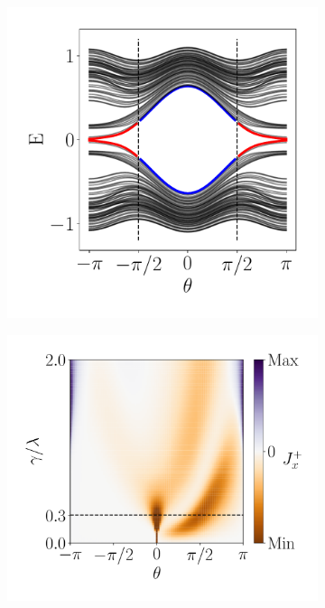 \begin{figure}[h!]
     \centering
    \captionsetup[sub]{font=small}
     \begin{minipage}[h!]{1\textwidth}
         \begin{subfigure}[b!]{0.3 \textwidth}
             \caption{}
             \includegraphics[width=\textwidth]{Imagenes/Resultados_pump_Fractal/xy/param_pump_A=0.5.pdf}
         \end{subfigure}\hspace*{-0.5em}
         \begin{subfigure}[b!]{0.35 \textwidth}
             \caption{}
             \includegraphics[width=\textwidth]{Imagenes/Resultados_pump_Fractal/xy/current_square_pump.pdf}

\end{subfigure}
\end{minipage}
\end{figure}
